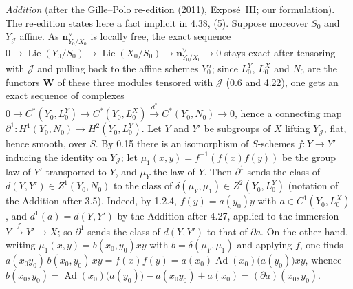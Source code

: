 \emph{Addition} (after the Gille--Polo re-edition (2011), Exposé~III; our
formulation). The re-edition states here a fact implicit in 4.38, (5).
Suppose moreover \(S_0\) and \(Y_{\mathscr J}\) affine. As
\(\mathbf n^\vee_{Y_0/X_0}\) is locally free, the exact sequence \(0\to
\operatorname{Lie}(Y_0/S_0)\to\operatorname{Lie}(X_0/S_0)\to\mathbf n^\vee_{Y_0/X_0}
\to0\) stays exact after tensoring with \(\mathscr J\) and pulling back to the
affine schemes \(Y_0^n\); since \(L_0^Y\), \(L_0^X\) and \(N_0\) are the functors
\(\mathbf W\) of these three modules tensored with \(\mathscr J\) (0.6 and 4.22),
one gets an exact sequence of complexes \(0\to C^*(Y_0,L_0^Y)\to C^*(Y_0,L_0^X)
\xrightarrow{d^*}C^*(Y_0,N_0)\to0\), hence a connecting map
\(\partial^1\colon H^1(Y_0,N_0)\to H^2(Y_0,L_0^Y)\). Let \(Y\) and \(Y'\) be
subgroups of \(X\) lifting \(Y_{\mathscr J}\), flat, hence smooth, over \(S\). By
0.15 there is an isomorphism of \(S\)-schemes \(f\colon Y\to Y'\) inducing the
identity on \(Y_{\mathscr J}\); let \(\mu_1(x,y)=f^{-1}(f(x)f(y))\) be the group
law of \(Y'\) transported to \(Y\), and \(\mu_Y\) the law of \(Y\). Then
\(\partial^1\) sends the class of \(d(Y,Y')\in Z^1(Y_0,N_0)\) to the class of
\(\delta(\mu_Y,\mu_1)\in Z^2(Y_0,L_0^Y)\) (notation of the Addition after
3.5). Indeed, by 1.2.4, \(f(y)=a(y_0)y\) with \(a\in C^1(Y_0,L_0^X)\), and
\(d^1(a)=d(Y,Y')\) by the Addition after 4.27, applied to the immersion
\(Y\xrightarrow{f}Y'\to X\); so \(\partial^1\) sends the class of \(d(Y,Y')\)
to that of \(\partial a\). On the other hand, writing
\(\mu_1(x,y)=b(x_0,y_0)xy\) with \(b=\delta(\mu_Y,\mu_1)\) and applying \(f\),
one finds \(a(x_0y_0)\,b(x_0,y_0)\,xy=f(x)f(y)=a(x_0)\operatorname{Ad}(x_0)
\bigl(a(y_0)\bigr)xy\), whence \(b(x_0,y_0)=\operatorname{Ad}(x_0)\bigl(a(y_0)
\bigr)-a(x_0y_0)+a(x_0)=(\partial a)(x_0,y_0)\).
